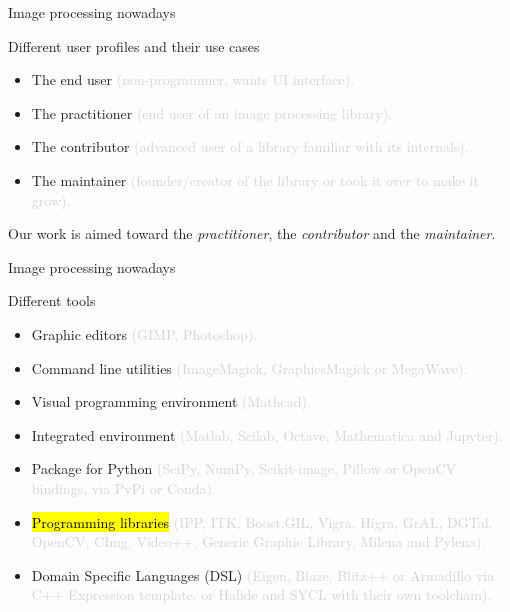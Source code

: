 \documentclass[12pt,aspectratio=169]{beamer}
\makeatletter
\newcommand{\GRAYOUT}[1]{\textcolor{lightgray}{#1}}%
\let\HL\hl
\renewcommand\hl{%
  \let\set@color\beamerorig@set@color
  \let\reset@color\beamerorig@reset@color
  \HL}
\makeatother
\begin{document}
\begin{frame}[fragile]{Image processing nowadays}
  \begin{alertblock}{Different user profiles and their use cases}
    \begin{itemize}
      \item The end user \GRAYOUT{(non-programmer, wants UI interface).}
      \item The practitioner \GRAYOUT{(end user of an image processing library).}
      \item The contributor \GRAYOUT{(advanced user of a library familiar with its internals).}
      \item The maintainer \GRAYOUT{(founder/creator of the library or took it over to make it grow).}
    \end{itemize}
  \end{alertblock}

  Our work is aimed toward the \emph{practitioner}, the \emph{contributor} and the \emph{maintainer}.
\end{frame}

\begin{frame}[fragile]{Image processing nowadays}
  \begin{alertblock}{Different tools}
    \begin{itemize}
      \item Graphic editors \GRAYOUT{(GIMP, Photoshop).}
      \item Command line utilities \GRAYOUT{(ImageMagick, GraphicsMagick or MegaWave).}
      \item Visual programming environment \GRAYOUT{(Mathcad).}
      \item Integrated environment \GRAYOUT{(Matlab, Scilab, Octave, Mathematica and Jupyter).}
      \item Package for Python \GRAYOUT{(SciPy, NumPy, Scikit-image, Pillow or OpenCV bindings, via PyPi or Conda).}
      \item \hl{Programming libraries} \GRAYOUT{(IPP, ITK, Boost.GIL, Vigra, Higra, GrAL, DGTal, OpenCV, CImg, Video++,
              Generic Graphic Library, Milena and Pylena).}
      \item Domain Specific Languages (DSL) \GRAYOUT{(Eigen, Blaze, Blitz++ or Armadillo via C++ Expression template, or
              Halide and SYCL with their own toolchain).}
    \end{itemize}
  \end{alertblock}
\end{frame}
\end{document}
